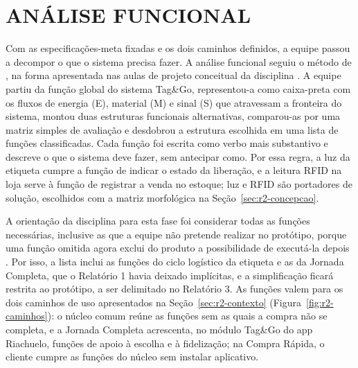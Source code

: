 
\section{ANÁLISE FUNCIONAL}
\label{sec:r2-funcional}

Com as especificações-meta fixadas e os dois caminhos definidos, a equipe passou a decompor o que o sistema precisa fazer. A análise funcional seguiu o método de , na forma apresentada nas aulas de projeto conceitual da disciplina \cite{zancul2026conceitual}. A equipe partiu da função global do sistema Tag\&Go, representou-a como caixa-preta com os fluxos de energia (E), material (M) e sinal (S) que atravessam a fronteira do sistema, montou duas estruturas funcionais alternativas, comparou-as por uma matriz simples de avaliação e desdobrou a estrutura escolhida em uma lista de funções classificadas. Cada função foi escrita como verbo mais substantivo e descreve o que o sistema deve fazer, sem antecipar como. Por essa regra, a luz da etiqueta cumpre a função de indicar o estado da liberação, e a leitura RFID na loja serve à função de registrar a venda no estoque; luz e RFID são portadores de solução, escolhidos com a matriz morfológica na Seção~\ref{sec:r2-concepcao}.

A orientação da disciplina para esta fase foi considerar todas as funções necessárias, inclusive as que a equipe não pretende realizar no protótipo, porque uma função omitida agora exclui do produto a possibilidade de executá-la depois \cite{zancul2026conceitual}. Por isso, a lista inclui as funções do ciclo logístico da etiqueta e as da Jornada Completa, que o Relatório 1 havia deixado implícitas, e a simplificação ficará restrita ao protótipo, a ser delimitado no Relatório 3. As funções valem para os dois caminhos de uso apresentados na Seção~\ref{sec:r2-contexto} (Figura~\ref{fig:r2-caminhos}): o núcleo comum reúne as funções sem as quais a compra não se completa, e a Jornada Completa acrescenta, no módulo Tag\&Go do app Riachuelo, funções de apoio à escolha e à fidelização; na Compra Rápida, o cliente cumpre as funções do núcleo sem instalar aplicativo.

